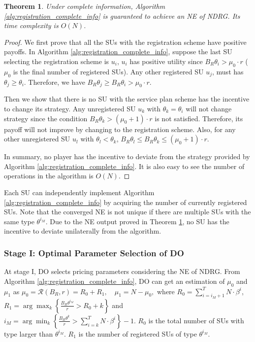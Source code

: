\documentclass[journal]{IEEEtran}
\newtheorem{theorem}{Theorem}
\begin{document}
\begin{theorem}
\label{thm:algorithm1_property}
Under complete information, Algorithm \ref{alg:registration_complete_info} is guaranteed to achieve an NE of NDRG. Its time complexity is $O(N)$.
\end{theorem}
\begin{proof}
We first prove that all the SUs with the registration scheme have positive payoffs. In Algorithm \ref{alg:registration_complete_info}, suppose the last SU selecting the registration scheme is $u_i$, $u_i$ has positive utility since $B_R\theta_{i}>\mu_0\cdot r$ ($\mu_0$ is the final number of registered SUs). Any other registered SU $u_j$, must has $\theta_{j}\geq \theta_{i}$. Therefore, we have $B_R\theta_{j}\geq B_R\theta_{i}>\mu_0\cdot r$.

Then we show that there is no SU with the service plan scheme has the incentive to change its strategy. Any unregistered SU $u_k$ with $\theta_k=\theta_i$ will not change strategy since the condition $B_R\theta_{k}>(\mu_0+1)\cdot r$ is not satisfied. Therefore, its payoff will not improve by changing to the registration scheme. Also, for any other unregistered SU $u_l$ with $\theta_l<\theta_k$, $B_R\theta_{l}\leq B_R\theta_{k}\leq(\mu_0+1)\cdot r$.

In summary, no player has the incentive to deviate from the strategy provided by Algorithm \ref{alg:registration_complete_info}. It is also easy to see the number of operations in the algorithm is $O(N)$.
\end{proof}

Each SU can independently implement Algorithm \ref{alg:registration_complete_info} by acquiring the number of currently registered SUs. Note that the converged NE is not unique if there are multiple SUs with the same type $\theta^{i_M}$. Due to the NE output proved in Theorem \ref{thm:algorithm1_property}, no SU has the incentive to deviate unilaterally from the algorithm.

\subsubsection{Stage I: Optimal Parameter Selection of DO}

At stage I, DO selects pricing parameters considering the NE of NDRG. From Algorithm \ref{alg:registration_complete_info}, DO can get an estimation of $\mu_0$ and $\mu_1$ as
$
\mu_0=\mathcal{R}(B_R, r)=R_0+R_1, \quad\mu_1=N-\mu_0,
$
where $R_0=\sum_{i=i_M+1}^T N\cdot\beta^i$, $R_1=\arg\max_k\left\{\frac{B_R\theta^{i_M}}{r}>R_0+k\right\}$ and $i_M=\arg\min_k\left\{\frac{B_R\theta^k}{r}>\sum_{i=k}^T N\cdot\beta^i\right\}-1$.
$R_0$ is the total number of SUs with type larger than $\theta^{i_M}$. $R_1$ is the number of registered SUs of type $\theta^{i_M}$.
\end{document}
